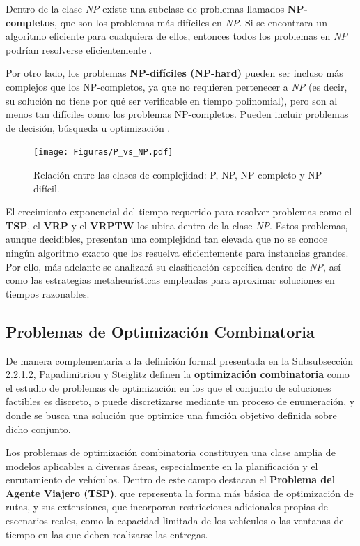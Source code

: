\documentclass[12pt,titlepage,twoside,openright]{book}
\begin{document}
Dentro de la clase \emph{NP} existe una subclase de problemas llamados \textbf{NP-completos}, que son los problemas más difíciles en \emph{NP}. Si se encontrara un algoritmo eficiente para cualquiera de ellos, entonces todos los problemas en \emph{NP} podrían resolverse eficientemente \citep{maldonado2013problema}.

Por otro lado, los problemas \textbf{NP-difíciles (NP-hard)} pueden ser incluso más complejos que los NP-completos, ya que no requieren pertenecer a \emph{NP} (es decir, su solución no tiene por qué ser verificable en tiempo polinomial), pero son al menos tan difíciles como los problemas NP-completos. Pueden incluir problemas de decisión, búsqueda u optimización \citep{maldonado2013problema}.

\begin{figure}[H]
	\centering
	\texttt{[image: Figuras/P\_vs\_NP.pdf]}
	\caption{Relación entre las clases de complejidad: P, NP, NP-completo y NP-difícil.}
	\label{fig:p_vs_np}
\end{figure}

El crecimiento exponencial del tiempo requerido para resolver problemas como el \textbf{TSP}, el \textbf{VRP} y el \textbf{VRPTW} los ubica dentro de la clase \emph{NP}. Estos problemas, aunque decidibles, presentan una complejidad tan elevada que no se conoce ningún algoritmo exacto que los resuelva eficientemente para instancias grandes. Por ello, más adelante se analizará su clasificación específica dentro de \emph{NP}, así como las estrategias metaheurísticas empleadas para aproximar soluciones en tiempos razonables.

\subsection{Problemas de Optimización Combinatoria}

De manera complementaria a la definición formal presentada en la Subsubsección 2.2.1.2, Papadimitriou y Steiglitz \citep{papadimitriou1998} definen la \textbf{optimización combinatoria} como el estudio de problemas de optimización en los que el conjunto de soluciones factibles es discreto, o puede discretizarse mediante un proceso de enumeración, y donde se busca una solución que optimice una función objetivo definida sobre dicho conjunto.

Los problemas de optimización combinatoria constituyen una clase amplia de modelos aplicables a diversas áreas, especialmente en la planificación y el enrutamiento de vehículos. Dentro de este campo destacan el \textbf{Problema del Agente Viajero (TSP)}, que representa la forma más básica de optimización de rutas, y sus extensiones, que incorporan restricciones adicionales propias de escenarios reales, como la capacidad limitada de los vehículos o las ventanas de tiempo en las que deben realizarse las entregas.
\end{document}
